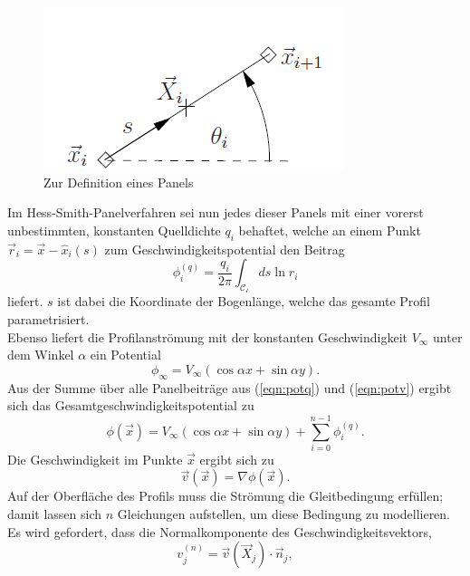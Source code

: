 \begin{figure}
\begin{center} \includegraphics[scale=0.5]{figures/panel.png} \end{center}
\caption{Zur Definition eines Panels}
\label{fig:panel}
\end{figure}

Im Hess-Smith-Panelverfahren sei nun jedes dieser Panels mit einer vorerst unbestimmten, konstanten Quelldichte $q_i$ behaftet, welche an einem Punkt $\vec r_i =  \vec x - \hat x_i(s)$ zum Geschwindigkeitspotential den Beitrag
\begin{equation}
\label{eqn:potq}
\phi_i^{(q)} =  \frac{q_i}{2 \pi } \int_{\mathcal{C_i}} ds \ln r_i
\end{equation}
liefert. $s$ ist dabei die Koordinate der Bogenlänge, welche das gesamte Profil parametrisiert. \\
Ebenso liefert die Profilanströmung mit der konstanten Geschwindigkeit $V_{\infty}$ unter dem Winkel $\alpha $ ein Potential
\begin{equation}
\label{eqn:potv}
\phi_{\infty} =  V_{\infty} (\cos \alpha x + \sin \alpha y).
\end{equation}
Aus der Summe über alle Panelbeiträge aus (\ref{eqn:potq}) und (\ref{eqn:potv}) ergibt sich das Gesamtgeschwindigkeitspotential zu
\begin{equation}
\label{eqn:potnovortex}
\phi(\vec x) =  V_{\infty} (\cos \alpha x + \sin \alpha y) + \sum_{i=0}^{n-1} \phi_i^{(q)}.
\end{equation}
Die Geschwindigkeit im Punkte $\vec x$  ergibt sich zu
\begin{equation}
\vec v ( \vec x) =  \nabla  \phi (\vec x).
\end{equation}
Auf der Oberfläche des Profils muss die Strömung die Gleitbedingung erfüllen; damit lassen sich $n$ Gleichungen aufstellen, um diese Bedingung zu modellieren. Es wird gefordert, dass die Normalkomponente des Geschwindigkeitsvektors,
\begin{equation}
v_j^{(n)} =  \vec v(\vec X_j) \cdot \vec n_j,
\end{equation}
